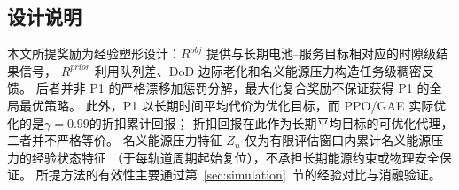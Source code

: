 \documentclass[a4paper,11pt]{article}
\begin{document}
\subsection{设计说明}

本文所提奖励为经验塑形设计：$R^{obj}$ 提供与长期电池--服务目标相对应的时隙级结果信号，
$R^{prior}$ 利用队列差、DoD 边际老化和名义能源压力构造任务级稠密反馈。
后者并非 P1 的严格漂移加惩罚分解，最大化复合奖励不保证获得 P1 的全局最优策略。
此外，P1 以长期时间平均代价为优化目标，而 PPO/GAE 实际优化的是$\gamma=0.99$的折扣累计回报；
折扣回报在此作为长期平均目标的可优化代理，二者并不严格等价。
名义能源压力特征 $Z_n$ 仅为有限评估窗口内累计名义能源压力的经验状态特征
（于每轨道周期起始复位），不承担长期能源约束或物理安全保证。
所提方法的有效性主要通过第~\ref{sec:simulation}~节的经验对比与消融验证。





\end{document}
